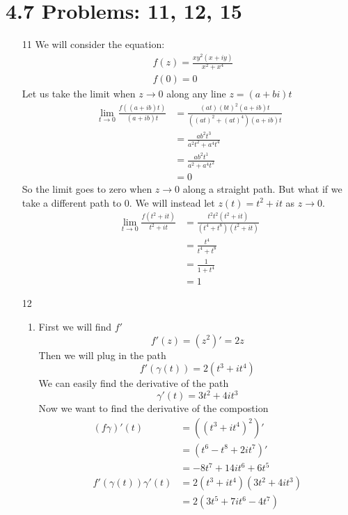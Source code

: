 \documentclass{article}
\begin{document}
  \section{4.7 Problems: 11, 12, 15}
  \begin{enumerate}
    \item[11]
      We will consider the equation:
      \begin{align*}
        &f(z)=\frac{xy^2(x+iy)}{x^2+x^4}\\
        &f(0)=0
      \end{align*}
      Let us take the limit when $z\to0$ along any line $z=(a+bi)t$
      \begin{align*}
        \lim_{t\to0}\frac{f((a+ib)t)}{(a+ib)t}&=\frac{(at)(bt)^2(a+ib)t}{((at)^2+(at)^4)(a+ib)t}\\
        &=\frac{ab^2t^3}{a^2t^2+a^4t^4}\\
        &=\frac{ab^2t^1}{a^2+a^4t^2}\\
        &=0
      \end{align*}
      So the limit goes to zero when $z\to0$ along a straight path. But what if we take a different path to 0. We will instead let $z(t)=t^2+it$ as $z\to0$.
      \begin{align*}
        \lim_{t\to0}\frac{f(t^2+it)}{t^2+it}&=\frac{t^2t^2(t^2+it)}{(t^4+t^8)(t^2+it)}\\
        &=\frac{t^4}{t^4+t^8}\\
        &=\frac{1}{1+t^4}\\
        &=1
      \end{align*}
    \item[12]
      \begin{enumerate}[label=(\roman*)]
        \item
          First we will find $f'$
          \[f'(z)=(z^2)'=2z\]
          Then we will plug in the path
          \[f'(\gamma(t))=2(t^3+it^4)\]
          We can easily find the derivative of the path
          \[\gamma'(t)=3t^2+4it^3\]
          Now we want to find the derivative of the compostion
          \begin{align*}
            (f\gamma)'(t)&=\left((t^3+it^4)^2\right)'\\
            &=\left(t^6-t^8+2it^7\right)'\\
            &=-8t^7+14it^6+6t^5\\
            f'(\gamma(t))\gamma'(t)&=2(t^3+it^4)(3t^2+4it^3)\\
            &=2(3t^5+7it^6-4t^7)\\

\end{align*}
\end{enumerate}
\end{enumerate}
\end{document}
